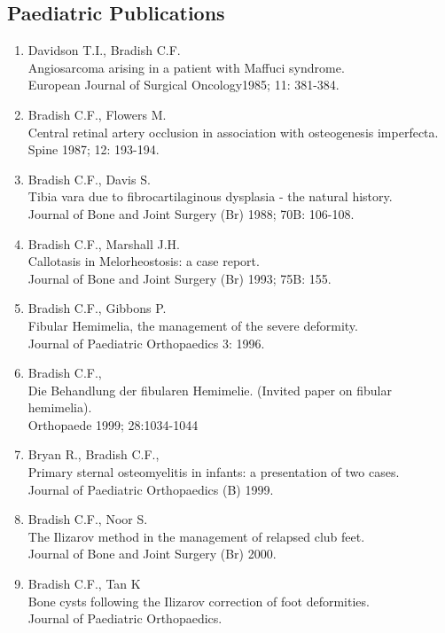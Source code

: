 \documentclass[margin,line]{res}
\begin{document}
\begin{resume}
\section{\sc Paediatric Publications}
\begin{enumerate}
\item Davidson T.I., Bradish C.F.\\
Angiosarcoma arising in a patient with Maffuci syndrome.\\
European Journal of Surgical Oncology1985; 11: 381-384.
\item Bradish C.F., Flowers M.\\
Central retinal artery occlusion in association with osteogenesis imperfecta.\\
Spine 1987; 12: 193-194.
\item Bradish C.F., Davis S.\\
Tibia vara due to fibrocartilaginous  dysplasia - the natural history.\\
Journal of Bone and Joint Surgery (Br) 1988; 70B: 106-108.
\item Bradish C.F., Marshall J.H.\\
Callotasis in Melorheostosis: a case report.\\
Journal of Bone and Joint Surgery (Br) 1993; 75B: 155.
\item Bradish C.F., Gibbons P.\\
Fibular Hemimelia, the management of the severe deformity.\\
Journal of Paediatric Orthopaedics 3: 1996.
\item Bradish C.F.,\\
Die Behandlung der fibularen Hemimelie.  (Invited paper on fibular hemimelia).\\
Orthopaede 1999; 28:1034-1044
\item Bryan R., Bradish C.F.,\\
Primary sternal osteomyelitis in infants: a presentation of two cases.\\
Journal of Paediatric Orthopaedics (B) 1999.
\item Bradish C.F., Noor S.\\
The Ilizarov method in the management of relapsed club feet.\\
Journal of Bone and Joint Surgery (Br) 2000.
\item Bradish C.F., Tan K\\
Bone cysts following the Ilizarov correction of foot deformities.\\
Journal of Paediatric Orthopaedics.

\end{enumerate}
\end{resume}
\end{document}
